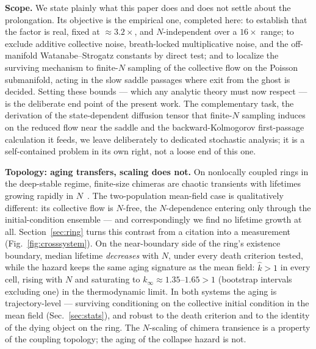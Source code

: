 \documentclass[pdflatex,sn-mathphys,Numbered]{sn-jnl}
\begin{document}
\textbf{Scope.} We state plainly what this paper does and does not settle about
the prolongation. Its objective is the empirical one, completed here: to establish
that the factor is real, fixed at $\approx 3.2\times$, and $N$-independent over a
$16\times$ range; to exclude additive collective noise, breath-locked
multiplicative noise, and the off-manifold Watanabe--Strogatz constants by direct
test; and to localize the surviving mechanism to finite-$N$ sampling of the
collective flow on the Poisson submanifold, acting in the slow saddle passages
where exit from the ghost is decided. Setting these bounds --- which any analytic
theory must now respect --- is the deliberate end point of the present work. The
complementary task, the derivation of the state-dependent diffusion tensor that
finite-$N$ sampling induces on the reduced flow near the saddle and the
backward-Kolmogorov first-passage calculation it feeds, we leave deliberately to
dedicated stochastic analysis; it is a self-contained problem in its own right,
not a loose end of this one.

\textbf{Topology: aging transfers, scaling does not.} On nonlocally coupled rings
in the deep-stable regime, finite-size chimeras are chaotic transients with
lifetimes growing rapidly in $N$~\cite{wo2011}. The two-population mean-field case
is qualitatively different: its collective flow is $N$-free, the $N$-dependence
entering only through the initial-condition ensemble --- and correspondingly we
find no lifetime growth at all. Section~\ref{sec:ring} turns this contrast from a
citation into a measurement (Fig.~\ref{fig:crosssystem}). On the near-boundary side of the ring's existence
boundary, median lifetime \emph{decreases} with $N$, under every death criterion
tested, while the hazard keeps the same aging signature as the mean field:
$\hat k > 1$ in every cell, rising with $N$ and saturating to
$k_\infty \approx 1.35$--$1.65 > 1$ (bootstrap intervals excluding one) in the
thermodynamic limit. In both systems the aging is trajectory-level --- surviving
conditioning on the collective initial condition in the mean field
(Sec.~\ref{sec:stats}), and robust to the death criterion and to the identity of
the dying object on the ring. The $N$-scaling of chimera transience is a property
of the coupling topology; the aging of the collapse hazard is not.
\end{document}
